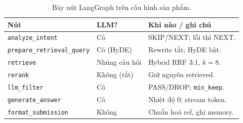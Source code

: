 \begin{table}[htp]
\centering
\caption{Bảy nút LangGraph trên cấu hình sản phẩm.}
\label{tab:bay-nut}
\begin{tabular}{p{3.3cm}p{2.2cm}p{7.8cm}}
\toprule
\textbf{Nút} & \textbf{LLM?} & \textbf{Khi nào / ghi chú} \\
\midrule
\texttt{analyze\_intent} & Có & SKIP/NEXT; lỗi thì NEXT. \\
\texttt{prepare\_retrieval\_query} & Có (HyDE) & Rewrite tắt; HyDE bật. \\
\texttt{retrieve} & Nhúng câu hỏi & Hybrid RRF 3:1, $k=8$. \\
\texttt{rerank} & Không (tắt) & Giữ nguyên retrieved. \\
\texttt{llm\_filter} & Có & PASS/DROP; \texttt{min\_keep}. \\
\texttt{generate\_answer} & Có & Nhiệt độ 0; stream token. \\
\texttt{format\_submission} & Không & Chuẩn hoá ref, ghi memory. \\
\bottomrule
\end{tabular}
\end{table}
